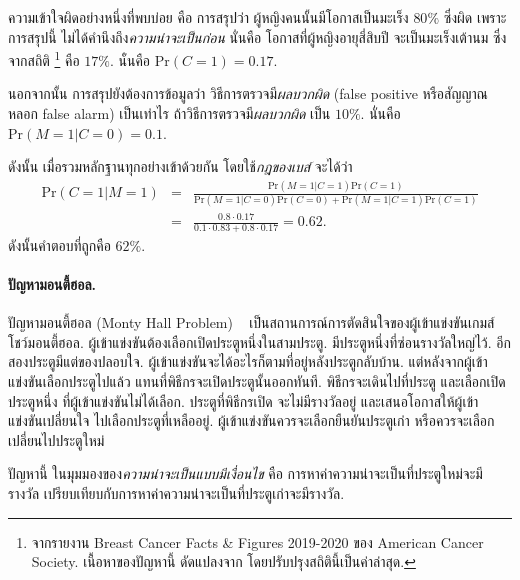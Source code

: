 ความเข้าใจผิดอย่างหนึ่งที่พบบ่อย
คือ การสรุปว่า ผู้หญิงคนนั้นมีโอกาสเป็นมะเร็ง $80\%$ ซึ่งผิด
เพราะการสรุปนี้ ไม่ได้คำนึงถึง\textit{ความน่าจะเป็นก่อน} นั่นคือ โอกาสที่ผู้หญิงอายุสี่สิบปี
จะเป็นมะเร็งเต้านม ซึ่งจากสถิติ%
\footnote{%
จากรายงาน
Breast Cancer Facts \& Figures 2019-2020
ของ American Cancer Society.
%
เนื้อหาของปัญหานี้ ดัดแปลงจาก \cite{Murphy2012}
โดยปรับปรุงสถิตินี้เป็นค่าล่าสุด.
}
คือ $17\%$.
นั่นคือ $\mathrm{Pr}(C = 1) = 0.17$.

นอกจากนั้น การสรุปยังต้องการข้อมูลว่า
วิธีการตรวจมี\textit{ผลบวกผิด} (false positive หรือสัญญาณหลอก false alarm)
เป็นเท่าไร
ถ้าวิธีการตรวจมี\textit{ผลบวกผิด} เป็น $10\%$.
นั่นคือ
$\mathrm{Pr}(M = 1|C = 0) = 0.1$.

ดังนั้น เมื่อรวมหลักฐานทุกอย่างเข้าด้วยกัน 
โดยใช้\textit{กฎของเบส์} จะได้ว่า
\begin{eqnarray}
\mathrm{Pr}(C = 1|M = 1) &=& \frac{\mathrm{Pr}(M = 1|C = 1) \mathrm{Pr}(C = 1)}{\mathrm{Pr}(M = 1|C = 0) \mathrm{Pr}(C = 0) + \mathrm{Pr}(M = 1|C = 1) \mathrm{Pr}(C = 1)}
\nonumber \\
&=& \frac{0.8 \cdot 0.17}{0.1 \cdot 0.83 + 0.8 \cdot 0.17}
= 0.62
\nonumber .
\end{eqnarray}
ดังนั้นคำตอบที่ถูกคือ $62\%$.

\paragraph{ปัญหามอนตี้ฮอล.}
ปัญหามอนตี้ฮอล (Monty Hall Problem)
 \
เป็นสถานการณ์การตัดสินใจของผู้เข้าแข่งขันเกมส์โชว์มอนตี้ฮอล. 
ผู้เข้าแข่งขันต้องเลือกเปิดประตูหนึ่งในสามประตู.
มีประตูหนึ่งที่ซ่อนรางวัลใหญ่ไว้.
อีกสองประตูมีแต่ของปลอบใจ.
ผู้เข้าแข่งขันจะได้อะไรก็ตามที่อยู่หลังประตูกลับบ้าน.
แต่หลังจากผู้เข้าแข่งขันเลือกประตูไปแล้ว แทนที่พิธีกรจะเปิดประตูนั้นออกทันที.
พิธีกรจะเดินไปที่ประตู
และเลือกเปิดประตูหนึ่ง ที่ผู้เข้าแข่งขันไม่ได้เลือก.
ประตูที่พิธีกรเปิด จะไม่มีรางวัลอยู่
และเสนอโอกาสให้ผู้เข้าแข่งขันเปลี่ยนใจ
ไปเลือกประตูที่เหลืออยู่.
ผู้เข้าแข่งขันควรจะเลือกยืนยันประตูเก่า หรือควรจะเลือกเปลี่ยนไปประตูใหม่

ปัญหานี้ ในมุมมองของ\textit{ความน่าจะเป็นแบบมีเงื่อนไข}
คือ การหาค่าความน่าจะเป็นที่ประตูใหม่จะมีรางวัล เปรียบเทียบกับการหาค่าความน่าจะเป็นที่ประตูเก่าจะมีรางวัล.

